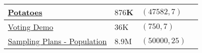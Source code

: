 \begin{customArrayStretch}{1.3}
\begin{longtable}{
    |
    >{\RaggedRight\arraybackslash}p{5cm}| %
    >{\hfill}p{2.5cm}| %
    >{\hfill}p{3cm}| %
    >{\hfill}p{2cm}| %
}
\href{https://drive.google.com/file/d/1GYUk0i9penKnSWODDkZfMzNxK2FUxDi8/view?usp=drive_link}{Potatoes} \label{Datasets/nth-iteration/potatoes} & 
$876$K &
$(47582, 7)$ & 
\cite{statistics/book/Statistics-for-Data-Scientists/Maurits-Kaptein} \\ \hline

\href{http://www.nth-iteration.com/wp-content/uploads/2018/08/voting_demo.csv}{Voting Demo} \label{Datasets/nth-iteration/voting_demo} & 
$36$K &
$(750, 7)$ & 
\cite{statistics/book/Statistics-for-Data-Scientists/Maurits-Kaptein} \\ \hline



\href{https://drive.google.com/file/d/1DKQnolgdVxQddQAp1haafo0AqvFVT5yj/view?usp=drive_link}{Sampling Plans - Population}  &
$8.9$M &
$(50000, 25)$ &
\cite{common/online/chatgpt} \\ \hline







\end{longtable}
\end{customArrayStretch}


